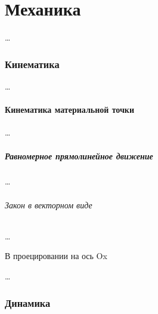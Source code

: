 \documentclass[a4paper, 12pt]{article}
\begin{document}
    \part{Механика}
        \dots
        \section{Кинематика}
            \dots
            \subsection{Кинематика материальной точки}
                \dots
                \subsubsection{Равномерное прямолинейное движение}
                    \dots
                    \paragraph{Закон в векторном виде}
                        \dots
                        \subparagraph{В проецировании на ось Ox}
                            \dots
        \newpage
        \section[Дин.]{Динамика} %
\end{document}
